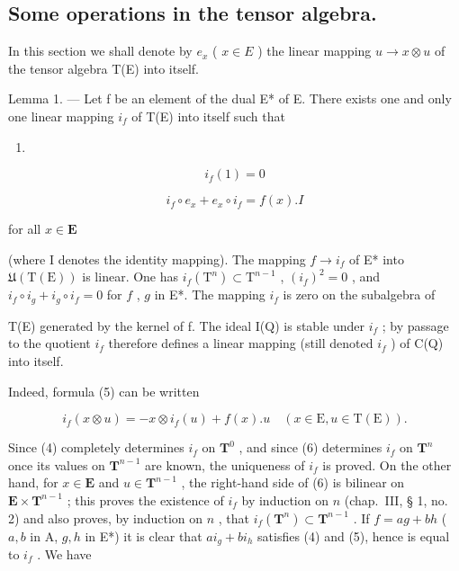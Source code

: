 \subsection{Some operations in the tensor algebra.}

In this section we shall denote by \(e_x\) ( \(x \in E\) ) the linear mapping \(u \to x \otimes u\) of the tensor algebra T(E) into itself.

Lemma 1. — Let f be an element of the dual E* of E. There exists one and only one linear mapping \(i_{f}\) of T(E) into itself such that

\begin{enumerate}
\def\labelenumi{(\arabic{enumi})}
\setcounter{enumi}{3}
\tightlist
\item
\end{enumerate}

\[
i _ {f} (1) = 0\tag{5}
\]

\[
i _ {f} \circ e _ {x} + e _ {x} \circ i _ {f} = f (x). I
\]

for all \(x \in \mathbf{E}\)

(where I denotes the identity mapping). The mapping \(f \to i_f\) of E* into \(\mathfrak{U}(\mathrm{T}(\mathrm{E}))\) is linear. One has \(i_f(\mathrm{T}^n) \subset \mathrm{T}^{n-1}\) , \((i_f)^2 = 0\) , and \(i_f \circ i_g + i_g \circ i_f = 0\) for \(f\) , \(g\) in E*. The mapping \(i_f\) is zero on the subalgebra of

T(E) generated by the kernel of f. The ideal I(Q) is stable under \(i_{f}\) ; by passage to the quotient \(i_{f}\) therefore defines a linear mapping (still denoted \(i_{f}\) ) of C(Q) into itself.

Indeed, formula (5) can be written

\[
i _ {f} (x \otimes u) = - x \otimes i _ {f} (u) + f (x). u \quad (x \in \mathrm{E}, u \in \mathrm{T(E)}).\tag{6}
\]

Since (4) completely determines \(i_{f}\) on \(\mathbf{T}^{0}\) , and since (6) determines \(i_{f}\) on \(\mathbf{T}^{n}\) once its values on \(\mathbf{T}^{n-1}\) are known, the uniqueness of \(i_{f}\) is proved. On the other hand, for \(x\in\mathbf{E}\) and \(u\in\mathbf{T}^{n-1}\) , the right-hand side of (6) is bilinear on \(\mathbf{E}\times\mathbf{T}^{n-1}\) ; this proves the existence of \(i_{f}\) by induction on \(n\) (chap.~III, § 1, no. 2) and also proves, by induction on \(n\) , that \(i_{f}(\mathbf{T}^{n})\subset\mathbf{T}^{n-1}\) . If \(f=ag+bh\) ( \(a,b\) in A, \(g,h\) in E*) it is clear that \(ai_{g}+bi_{h}\) satisfies (4) and (5), hence is equal to \(i_{f}\) . We have

